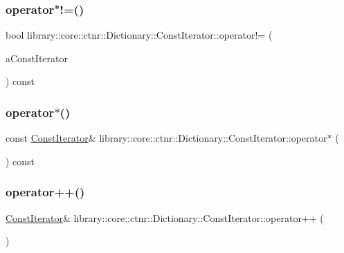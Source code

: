 \subsubsection{\texorpdfstring{operator"!=()}{operator!=()}}
{\footnotesize\ttfamily bool library\+::core\+::ctnr\+::\+Dictionary\+::\+Const\+Iterator\+::operator!= (\begin{DoxyParamCaption}\item[{const \hyperlink{classlibrary_1_1core_1_1ctnr_1_1Dictionary_1_1ConstIterator}{Const\+Iterator} \&}]{a\+Const\+Iterator }\end{DoxyParamCaption}) const}

\mbox{\label{classlibrary_1_1core_1_1ctnr_1_1Dictionary_1_1ConstIterator_adb1c1a55c8f9dba41f2ab3061e69dee2}} 
\subsubsection{\texorpdfstring{operator$\ast$()}{operator*()}}
{\footnotesize\ttfamily const \hyperlink{classlibrary_1_1core_1_1ctnr_1_1Dictionary_1_1ConstIterator}{Const\+Iterator}\& library\+::core\+::ctnr\+::\+Dictionary\+::\+Const\+Iterator\+::operator$\ast$ (\begin{DoxyParamCaption}{ }\end{DoxyParamCaption}) const}

\mbox{\label{classlibrary_1_1core_1_1ctnr_1_1Dictionary_1_1ConstIterator_a7a8907d90b0014ef1645028ef8edeff3}} 
\subsubsection{\texorpdfstring{operator++()}{operator++()}\hspace{0.1cm}{\footnotesize\ttfamily [1/2]}}
{\footnotesize\ttfamily \hyperlink{classlibrary_1_1core_1_1ctnr_1_1Dictionary_1_1ConstIterator}{Const\+Iterator}\& library\+::core\+::ctnr\+::\+Dictionary\+::\+Const\+Iterator\+::operator++ (\begin{DoxyParamCaption}{ }\end{DoxyParamCaption})}

